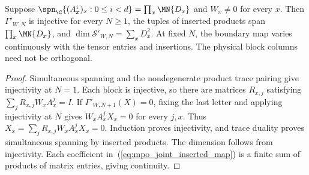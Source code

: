 \begin{lemma}
    \label{thm:mpo_joint_inserted_injective}
    \leanok
    Suppose $\spn_{\C}\{(A_x^i)_x:0\leq i<d\}=\prod_x\MN{D_x}$
    and $W_x\neq0$ for every $x$. Then $\Gamma'_{W,N}$ is injective for
    every $N\geq1$, the tuples of inserted products span
    $\prod_x\MN{D_x}$, and $\dim\mathcal S'_{W,N}=\sum_xD_x^2$.
    At fixed $N$, the boundary map varies continuously with the tensor
    entries and insertions. The physical block columns need not be orthogonal.
\end{lemma}
\begin{proof}
    \leanok
    Simultaneous spanning and the nondegenerate product trace pairing
    give injectivity at $N=1$. Each block is injective, so there are
    matrices $R_{x,j}$ satisfying $\sum_jR_{x,j}W_xA_x^j=I$.
    If $\Gamma'_{W,N+1}(X)=0$, fixing the last letter and applying
    injectivity at $N$ gives $W_xA_x^jX_x=0$ for every $j,x$.
    Thus $X_x=\sum_jR_{x,j}W_xA_x^jX_x=0$.
    Induction proves injectivity, and trace duality proves simultaneous
    spanning by inserted products. The dimension follows from injectivity.
    Each coefficient in~(\ref{eq:mpo_joint_inserted_map}) is a finite
    sum of products of matrix entries, giving continuity.
\end{proof}

